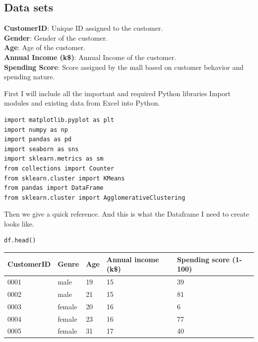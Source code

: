 \documentclass{article}
\begin{document}
\subsection{Data sets}

\textbf{CustomerID}: Unique ID assigned to the customer.\\
\textbf{Gender}: Gender of the customer.\\
\textbf{Age}: Age of the customer.\\
\textbf{Annual Income (k\$)}: Annual Income of the customer.\\
\textbf{Spending Score}: Score assigned by the mall based on customer behavior and spending nature.
\vspace{0,5cm}

First I will include all the important and required Python libraries
Import modules and existing data from Excel into Python. 

\begin{lstlisting}
import matplotlib.pyplot as plt
import numpy as np
import pandas as pd
import seaborn as sns
import sklearn.metrics as sm
from collections import Counter
from sklearn.cluster import KMeans
from pandas import DataFrame
from sklearn.cluster import AgglomerativeClustering
\end{lstlisting}


Then we give a quick reference. And this is what the Dataframe I need to create looks like.

\begin{lstlisting}
df.head()
\end{lstlisting}

\vspace{0,5cm}

\begin{center}
    \begin{tabular}{|l|l|l|l|l|}
    \hline
        CustomerID & Genre & Age & Annual income (k\$) & Spending score (1-100) \\ \hline
        0001 & male & 19 & 15 & 39 \\ \hline
        0002 & male & 21 & 15 & 81 \\ \hline
        0003 & female & 20 & 16 & 6 \\ \hline
        0004 & female & 23 & 16 & 77 \\ \hline
        0005 & female & 31 & 17 & 40 \\ \hline
 \end{tabular}
 \end{center}
\end{document}
